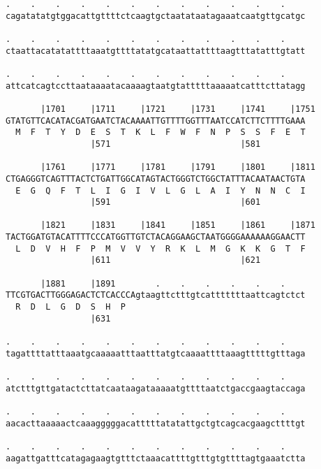 \documentclass{article}
\begin{document}
\begin{Verbatim}
.    .    .    .    .    .    .    .    .    .    .    .    
cagatatatgtggacattgttttctcaagtgctaatataatagaaatcaatgttgcatgc
                                                            
.    .    .    .    .    .    .    .    .    .    .    .    
ctaattacatatattttaaatgttttatatgcataattattttaagtttatatttgtatt
                                                            
.    .    .    .    .    .    .    .    .    .    .    .    
attcatcagtccttaataaaatacaaaagtaatgtatttttaaaaatcatttcttatagg
                                                            
       |1701     |1711     |1721     |1731     |1741     |1751
GTATGTTCACATACGATGAATCTACAAAATTGTTTTGGTTTAATCCATCTTCTTTTGAAA
  M  F  T  Y  D  E  S  T  K  L  F  W  F  N  P  S  S  F  E  T
                 |571                          |581         
  
       |1761     |1771     |1781     |1791     |1801     |1811
CTGAGGGTCAGTTTACTCTGATTGGCATAGTACTGGGTCTGGCTATTTACAATAACTGTA
  E  G  Q  F  T  L  I  G  I  V  L  G  L  A  I  Y  N  N  C  I
                 |591                          |601         
  
       |1821     |1831     |1841     |1851     |1861     |1871
TACTGGATGTACATTTTCCCATGGTTGTCTACAGGAAGCTAATGGGGAAAAAAGGAACTT
  L  D  V  H  F  P  M  V  V  Y  R  K  L  M  G  K  K  G  T  F
                 |611                          |621         
  
       |1881     |1891        .    .    .    .    .    .    
TTCGTGACTTGGGAGACTCTCACCCAgtaagttctttgtcatttttttaattcagtctct
  R  D  L  G  D  S  H  P                                    
                 |631                                       
  
.    .    .    .    .    .    .    .    .    .    .    .    
tagattttatttaaatgcaaaaatttaatttatgtcaaaattttaaagtttttgtttaga
                                                            
.    .    .    .    .    .    .    .    .    .    .    .    
atctttgttgatactcttatcaataagataaaaatgttttaatctgaccgaagtaccaga
                                                            
.    .    .    .    .    .    .    .    .    .    .    .    
aacacttaaaaactcaaagggggacatttttatatattgctgtcagcacgaagcttttgt
                                                            
.    .    .    .    .    .    .    .    .    .    .    .    
aagattgatttcatagagaagtgtttctaaacattttgtttgtgttttagtgaaatctta
                                                            

\end{Verbatim}
\end{document}
